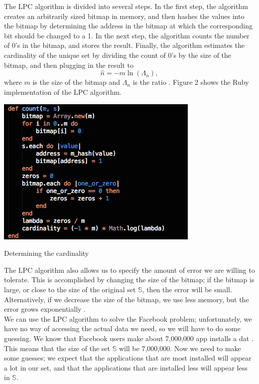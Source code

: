 \documentclass{article}
\begin{document}
\indent The LPC algorithm is divided into several steps. In the first step, the algorithm creates an arbitrarily sized bitmap in memory, and then hashes the values into the bitmap by determining the address in the bitmap at which the corresponding bit should be changed to a 1.
In the next step, the algorithm counts the number of 0's in the bitmap, and stores the result.
Finally, the algorithm estimates the cardinality of the unique set by dividing the count of 0's by the size of the bitmap, and then plugging in the result to
\[
\hat{n} = -m \ln{(\Lambda_{n})},
\]
where $m$ is the size of the bitmap and $\Lambda_{n}$ is the ratio \cite{Whang}. 
Figure 2 shows the Ruby implementation of the LPC algorithm.
\begin{floatingfigure}[R]{6cm}
\begin{framed}
\centering
\includegraphics[scale=0.4]{fb_problem/lpc}
\caption{Determining the cardinality}
\end{framed}
\end{floatingfigure}
\noindent The LPC algorithm also allows us to specify the amount of error we are willing to tolerate.
This is accomplished by changing the size of the bitmap; if the bitmap is large, or close to the size of the original set $\mathbb{S}$, then the error will be small.
Alternatively, if we decrease the size of the bitmap, we use less memory, but the error grows exponentially \cite{Hoff}.\\
\indent We can use the LPC algorithm to solve the Facebook problem; unfortunately, we have no way of accessing the actual data we need, so we will have to do some guessing. 
We know that Facebook users make about 7,000,000 app installs a dat \cite{Facebook-2}.
This means that the size of the set $\mathbb{S}$ will be 7,000,000.
Now we need to make some guesses; we expect that the applications that are most installed will appear a lot in our set, and that the applications that are installed less will appear less in $\mathbb{S}$. 
\end{document}
